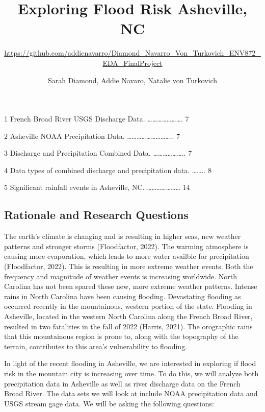 \documentclass[
]{article}
\title{\textbf{Exploring Flood Risk Asheville, NC}}
\subtitle{\url{https://github.com/addienavarro/Diamond_Navarro_Von_Turkovich_ENV872_EDA_FinalProject}}
\author{Sarah Diamond, Addie Navaro, Natalie von Turkovich}
\date{}
\begin{document}
\maketitle

\newpage
\tableofcontents 
\newpage
\listoftables

1 French Broad River USGS Discharge Data.
\ldots\ldots\ldots\ldots\ldots\ldots\ldots. 7

2 Asheville NOAA Precipitation Data.
\ldots\ldots\ldots\ldots\ldots\ldots\ldots\ldots\ldots.. 7

3 Discharge and Precipitation Combined Data.
\ldots\ldots\ldots\ldots\ldots\ldots.. 7

4 Data types of combined discharge and precipitation data.
\ldots\ldots.. 8

5 Significant rainfall events in Asheville, NC.
\ldots\ldots\ldots\ldots\ldots\ldots\ldots{} 14

\newpage
\listoffigures 
\newpage

\hypertarget{rationale-and-research-questions}{%
\subsection{\texorpdfstring{\textbf{Rationale and Research
Questions}}{Rationale and Research Questions}}\label{rationale-and-research-questions}}

The earth's climate is changing and is resulting in higher seas, new
weather patterns and stronger storms (Floodfactor, 2022). The warming
atmosphere is causing more evaporation, which leads to more water
availble for precipitation (Floodfactor, 2022). This is resulting in
more extreme weather events. Both the frequency and magnitude of weather
events is increasing worldwide. North Carolina has not been spared these
new, more extreme weather patterns. Intense rains in North Carolina have
been causing flooding. Devastating flooding as occurred recently in the
mountainous, western portion of the state. Flooding in Asheville,
located in the western North Carolina along the French Broad River,
resulted in two fatalities in the fall of 2022 (Harris, 2021). The
orographic rains that this mountainous region is prone to, along with
the topography of the terrain, contributes to this area's vulnerability
to flooding.

In light of the recent flooding in Asheville, we are interested in
exploring if flood risk in the mountain city is increasing over time. To
do this, we will analyze both precipitation data in Asheville as well as
river discharge data on the French Broad River. The data sets we will
look at include NOAA precipitation data and USGS stream gage data. We
will be asking the following questions:
\end{document}
